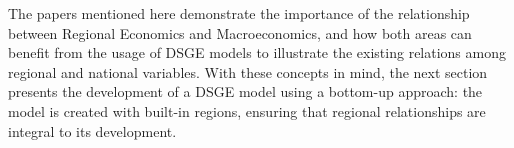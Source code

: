 \documentclass[../thesis.tex]{subfiles}
\begin{document}

The papers mentioned here demonstrate the importance of the relationship between Regional Economics and Macroeconomics, and how both areas can benefit from the usage of DSGE models to illustrate the existing relations among regional and national variables. With these concepts in mind, the next section presents the development of a DSGE model using a bottom-up approach: the model is created with built-in regions, ensuring that regional relationships are integral to its development.


\end{document}
